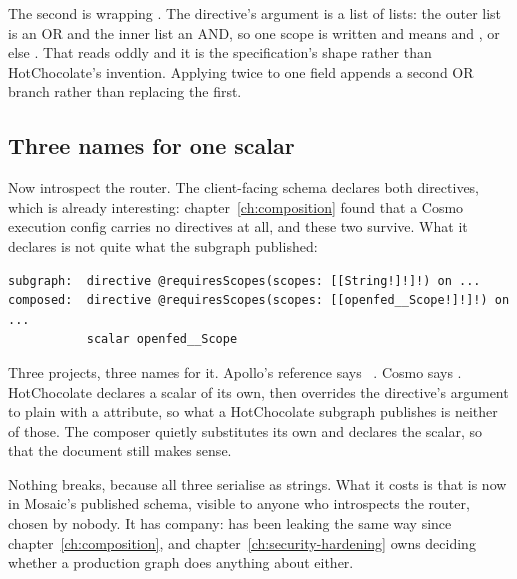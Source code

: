 %
The second is  wrapping . The
directive's argument is a list of lists: the outer list is an OR and the inner
list an AND, so one scope is written  and
\code{[["a","b"],["c"]]} means  and , or else . That
reads oddly and it is the specification's shape rather than HotChocolate's
invention. Applying \code{[RequiresScopes]} twice to one field appends a second
OR branch rather than replacing the first.

\subsection*{Three names for one scalar}

%
Now introspect the router. The client-facing schema declares both directives,
which is already interesting: chapter~\ref{ch:composition} found that a Cosmo
execution config carries no  directives at all, and these two
survive. What it declares is not quite what the subgraph published:

\begin{verbatim}
subgraph:  directive @requiresScopes(scopes: [[String!]!]!) on ...
composed:  directive @requiresScopes(scopes: [[openfed__Scope!]!]!) on ...
           scalar openfed__Scope
\end{verbatim}

Three projects, three names for it. Apollo's reference says
~\autocite{apollo2026authdirectives}. Cosmo says
. HotChocolate declares a  scalar of its
own, then overrides the directive's argument to plain  with a
\code{[GraphQLType]} attribute, so what a HotChocolate subgraph publishes is
neither of those. The composer quietly substitutes its own and declares the
scalar, so that the document still makes sense.

Nothing breaks, because all three serialise as strings. What it costs is that
 is now in Mosaic's published schema, visible to
anyone who introspects the router, chosen by nobody. It has company:
 has been leaking the same way since
chapter~\ref{ch:composition}, and chapter~\ref{ch:security-hardening} owns
deciding whether a production graph does anything about either.


